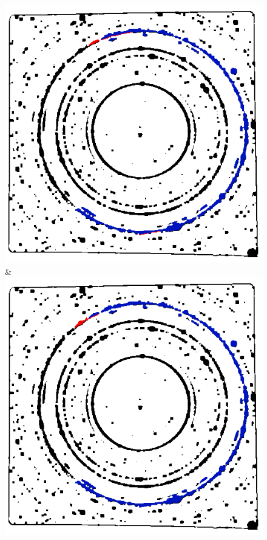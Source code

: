 \documentclass[preprint]{iucr}              %
\begin{document}
\begin{figure}
\begin{tabular}
\includegraphics[width=\linewidth]{Detail/o_Si12_0002_DR_2_3.png}&
\includegraphics[width=\linewidth]{Detail/o_Si12_0002_DR_2_4.png}


\end{tabular}
\end{figure}
\end{document}
